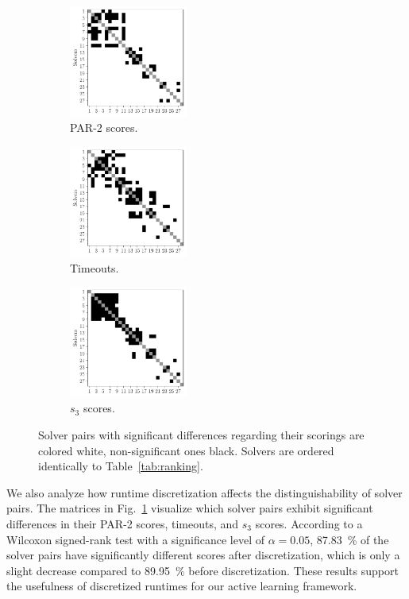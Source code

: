 \documentclass[sn-basic, Numbered]{sn-jnl} %
\begin{document}
\begin{figure}[tb]
	\centering
	\begin{subfigure}{0.32\textwidth}
		\centering
		\includegraphics[width=3.9cm]{../plots/par2sigdiff.pdf}
		\caption{PAR-2 scores.}
	\end{subfigure}
	\begin{subfigure}{0.32\textwidth}
		\centering
		\includegraphics[width=3.9cm]{../plots/timeoutsigdiff.pdf}
		\caption{Timeouts.}
	\end{subfigure}
	\begin{subfigure}{0.32\textwidth}
		\centering
		\includegraphics[width=3.9cm]{../plots/s3sigdiff.pdf}
		\caption{$s_3$ scores.}
	\end{subfigure}
	\caption{Solver pairs with significant differences regarding their scorings are colored white, non-significant ones black. Solvers are ordered identically to Table~\ref{tab:ranking}.}
	\label{fig:solver-confusion-matrices}
\end{figure}

We also analyze how runtime discretization affects the distinguishability of solver pairs.
The matrices in Fig.~\ref{fig:solver-confusion-matrices} visualize which solver pairs exhibit significant differences in their PAR-2 scores, timeouts, and $s_3$ scores.
According to a Wilcoxon signed-rank test with a significance level of $\alpha = 0.05$, \SI{87.83}{\%} of the solver pairs have significantly different scores after discretization, which is only a slight decrease compared to \SI{89.95}{\%} before discretization.
These results support the usefulness of discretized runtimes for our active learning framework.
\end{document}
